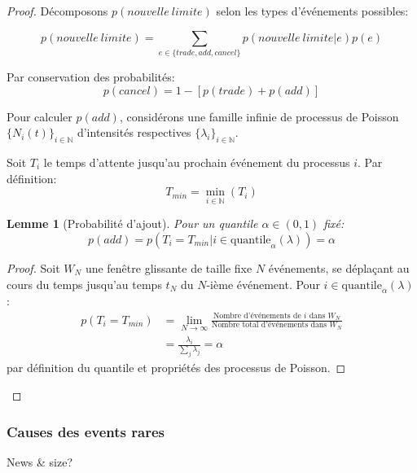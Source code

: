 \documentclass[12pt,a4paper]{article}
\newtheorem{lemma}[theorem]{Lemme}
\theoremstyle{definition}
\theoremstyle{remark}
\begin{document}
\begin{proof}
Décomposons $p(nouvelle\ limite)$ selon les types d'événements possibles:

\begin{equation}
    p(nouvelle\ limite) = \sum_{e \in \{trade,add,cancel\}} p(nouvelle\ limite|e)p(e)
\end{equation}

Par conservation des probabilités:
\begin{equation}
    p(cancel) = 1-[p(trade)+p(add)]
\end{equation}

Pour calculer $p(add)$, considérons une famille infinie de processus de Poisson $\{N_i(t)\}_{i\in\mathbb{N}}$ d'intensités respectives $\{\lambda_i\}_{i\in\mathbb{N}}$. 

Soit $T_i$ le temps d'attente jusqu'au prochain événement du processus $i$. Par définition:
\begin{equation}
    T_{min} = \min_{i\in\mathbb{N}}(T_i)
\end{equation}

\begin{lemma}[Probabilité d'ajout]
Pour un quantile $\alpha \in (0,1)$ fixé:
\begin{equation}
    p(add) = p(T_i = T_{min}|i \in \text{quantile}_\alpha(\lambda)) = \alpha
\end{equation}
\end{lemma}

\begin{proof}
Soit $W_N$ une fenêtre glissante de taille fixe $N$ événements, se déplaçant au cours du temps jusqu'au temps $t_N$ du $N$-ième événement. Pour $i \in \text{quantile}_\alpha(\lambda)$:
\begin{align*}
    p(T_i = T_{min}) &= \lim_{N\to\infty} \frac{\text{Nombre d'événements de }i\text{ dans }W_N}{\text{Nombre total d'événements dans }W_N} \\
    &= \frac{\lambda_i}{\sum_j \lambda_j} = \alpha
\end{align*}
par définition du quantile et propriétés des processus de Poisson.
\end{proof}
\end{proof}
\subsubsection{Causes des events rares}
News \& size?
\end{document}
